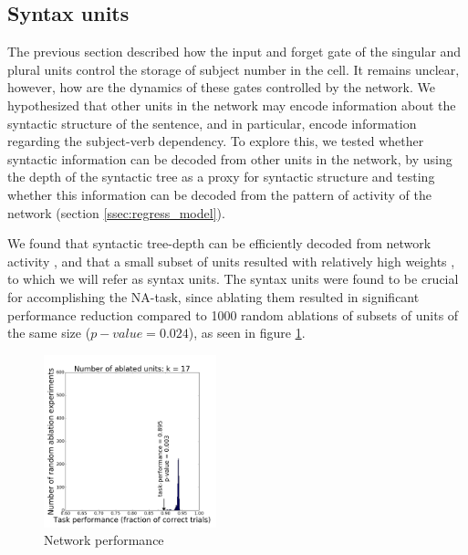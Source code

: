 \subsection{Syntax units}
The previous section described how the input and forget gate of the singular and plural units control the storage of subject number in the cell. It remains unclear, however, how are the dynamics of these gates controlled by the network. We hypothesized that other units in the network may encode information about the syntactic structure of the sentence, and in particular, encode information regarding the subject-verb dependency. To explore this, we tested whether syntactic information can be decoded from other units in the network, by using the depth of the syntactic tree as a proxy for syntactic structure  and testing whether this information can be decoded from the pattern of activity of the network (section \ref{ssec:regress_model}). 

We found that syntactic tree-depth can be efficiently decoded from network activity , and that a small subset of units resulted with relatively high weights , to which we will refer as syntax units. The syntax units were found to be crucial for accomplishing the NA-task, since ablating them resulted in significant performance reduction compared to 1000 random ablations of subsets of units of the same size ($p-value=0.024$), as seen in figure \ref{fig:ablation-syntax}. 

\begin{figure}[h]
    \centering
    \includegraphics[height=5cm]{Figures/null_distribution_ablation_experiment_k_17.png}
    \caption{Network performance}
    \label{fig:ablation-syntax}
\end{figure}

